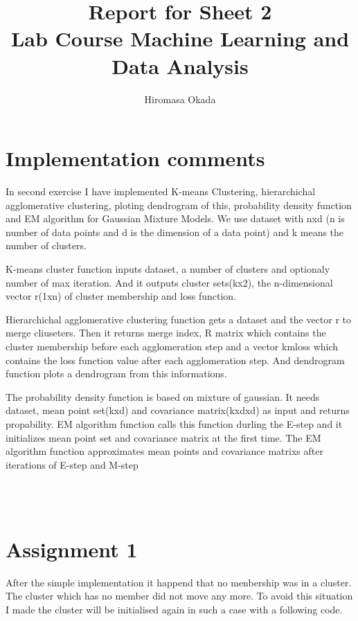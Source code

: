 \documentclass[a4paper,11pt]{article}
\begin{document}
\author{Hiromasa Okada}
\title{\vspace{-2cm}Report for Sheet 2\\
\small{Lab Course Machine Learning and Data Analysis}}
\maketitle

\section*{Implementation comments}

In second exercise I have implemented K-means Clustering, hierarchichal agglomerative clustering, ploting dendrogram of this, probability density function and EM algorithm for Gaussian Mixture Models. We use dataset with nxd (n is number of data points and d is the dimension of a data point)
and k means the number of clusters. 

K-means cluster function inputs dataset, a number of clusters and optionaly number of max iteration. And it outputs cluster sets(kx2), the n-dimensional vector r(1xn) of cluster membership and loss function.

Hierarchichal agglomerative clustering function gets a dataset and the vector r to merge cliuseters. Then it returns merge index, R matrix which contains the cluster membership before each agglomeration step and a vector kmloss which contains the loss function value after each agglomeration step. And dendrogram function plots a dendrogram from this informations.

The probability density function is based on mixture of gaussian. It needs dataset, mean point set(kxd) and covariance matrix(kxdxd) as input and returns propability. EM algorithm function calls this function durling the E-step and it initializes mean point set and covariance matrix at the first time.
The EM algorithm function approximates mean points and covariance matrixs after iterations of E-step and M-step

\begin{verbatim}



\end{verbatim}


\section*{Assignment 1}
After the simple implementation it happend that no menbership was in a cluster. The cluster which has no member did not move any more. To avoid this situation I made the cluster will be initialised again in such a case with a following code.
\end{document}
